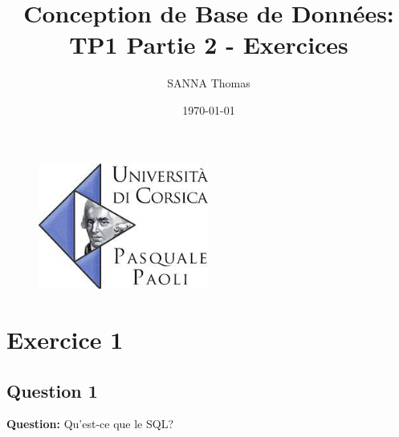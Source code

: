 \documentclass{article}
\title{Conception de Base de Données: \\ TP1 Partie 2 - Exercices}
\author{SANNA Thomas}
\date{\today}
\begin{document}
\begin{figure}
  \centering
  \includegraphics[width=0.5\textwidth]{img/logoUniv.jpg}
  \label{fig:mysql-logo}
\end{figure}

\maketitle

\break\tableofcontents

\break\section{Exercice 1}

\subsection{Question 1}

\textbf{Question:} Qu'est-ce que le SQL?
\end{document}
